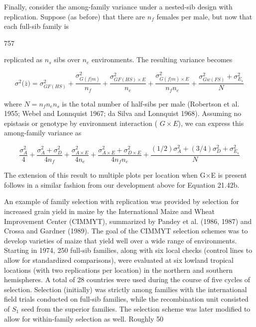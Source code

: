 \documentclass{article}
\begin{document}
Finally, consider the among-family variance under a nested-sib design with replication. Suppose (as before) that there are  $ n_{f} $ females per male, but now that each full-sib family is

757

replicated as  $ n_{s} $ sibs over  $ n_{e} $ environments. The resulting variance becomes

\begin{equation}
\sigma^{2}\big(\overline{z}\big)=\sigma_{G F(H S)}^{2}+\frac{\sigma_{G(f|m)}^{2}}{n_{f}}+\frac{\sigma_{G F(H S)\times E}^{2}}{n_{e}}+\frac{\sigma_{G(f|m)\times E}^{2}}{n_{f}n_{e}}+\frac{\sigma_{G w(F S)}^{2}+\sigma_{E_{s}}^{2}}{N}
\tag{21.43a}
\label{eq:21_43a}
\end{equation}

where  $ N = n_f n_e n_s $ is the total number of half-sibs per male (Robertson et al. 1955; Webel and Lonnquist 1967; da Silva and Lonnquist 1968). Assuming no epistasis or genotype by environment interaction ( $ G \times E $), we can express this among-family variance as

\begin{equation}
\frac{\sigma_{A}^{2}}{4}+\frac{\sigma_{A}^{2}+\sigma_{D}^{2}}{4n_{f}}+\frac{\sigma_{A\times E}^{2}}{4n_{e}}+\frac{\sigma_{A\times E}^{2}+\sigma_{D\times E}^{2}}{4n_{f}n_{e}}+\frac{(1/2)\sigma_{A}^{2}+(3/4)\sigma_{D}^{2}+\sigma_{E_{s}}^{2}}{N}
\tag{21.43b}
\label{eq:21_43b}
\end{equation}

The extension of this result to multiple plots per location when G×E is present follows in a similar fashion from our development above for Equation 21.42b.

An example of family selection with replication was provided by selection for increased grain yield in maize by the International Maize and Wheat Improvement Center (CIMMYT), summarized by Pandey et al. (1986, 1987) and Crossa and Gardner (1989). The goal of the CIMMYT selection schemes was to develop varieties of maize that yield well over a wide range of environments. Starting in 1974, 250 full-sib families, along with six local checks (control lines to allow for standardized comparisons), were evaluated at six lowland tropical locations (with two replications per location) in the northern and southern hemispheres. A total of 28 countries were used during the course of five cycles of selection. Selection (initially) was strictly among families with the international field trials conducted on full-sib families, while the recombination unit consisted of  $ S_{1} $ seed from the superior families. The selection scheme was later modified to allow for within-family selection as well. Roughly 50%
\end{document}
